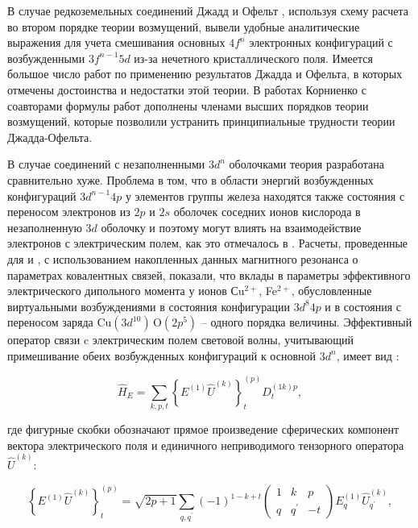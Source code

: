 В случае редкоземельных соединений Джадд \cite{Judd1962} и Офельт \cite{Ofelt1962}, используя схему расчета во втором порядке теории возмущений, вывели удобные аналитические выражения для учета смешивания основных $4f^n$ электронных конфигураций с возбужденными $3f^{n-1}5d$ из-за нечетного кристаллического поля. Имеется большое число работ по применению результатов Джадда и Офельта, в которых отмечены достоинства и недостатки этой теории. В работах Корниенко с соавторами \cite{Kornienko1990, Dunina2008, Dunina2014} формулы работ \cite{Judd1962, Ofelt1962} дополнены членами высших порядков теории возмущений, которые позволили устранить принципиальные трудности теории Джадда-Офельта. 

В случае соединений с незаполненными $3d^n$ оболочками теория разработана сравнительно хуже. Проблема в том, что в области энергий возбужденных конфигураций $3d^{n-1}4p$ у элементов группы железа находятся также состояния с переносом электронов из $2p$ и $2s$ оболочек соседних ионов кислорода в незаполненную $3d$ оболочку и поэтому могут влиять на взаимодействие электронов с электрическим полем, как это отмечалось в \cite{Kornienko1977}. Расчеты, проведенные для  \cite{Eremin2019jetp} и  \cite{Eremin2019prb}, с использованием накопленных данных магнитного резонанса о параметрах ковалентных связей, показали, что вклады в параметры эффективного электрического дипольного момента у ионов Сu$^{2+}$, Fe$^{2+}$, обусловленные виртуальными возбуждениями в состояния конфигурации $3d^{8}4p$ и в состояния с переносом заряда $\text{Cu}(3d^{10}) \, \text{O}(2p^{5})$ – одного порядка величины. 
Эффективный оператор связи c электрическим полем световой волны, учитывающий примешивание обеих возбужденных конфигураций к основной $3d^n$, имеет вид \cite{Eremin2019jetp, Eremin2019prb}:

\begin{equation}
	\label{eq:HE}
	\hat{H}_{E}=\sum_{k, p, t}\left\{E^{(1)} \hat{U}^{(k)}\right\}_{t}^{(p)} D_{t}^{(1 k) p},
\end{equation}

где фигурные скобки обозначают прямое произведение сферических компонент вектора электрического поля и единичного неприводимого тензорного оператора $\hat{U}^{(k)}$:

\begin{equation}
	\label{eq:electricalProduct}
	\left\{E^{(1)} \hat{U}^{(k)}\right\}_{t}^{(p)} = \sqrt{2p+1} \sum_{q,q^\prime} (-1)^{1-k+t} 
	\begin{pmatrix}
		1 & k & p \\
		q & q^\prime & -t
	\end{pmatrix}
	E_{q}^{(1)} \hat{U}_{q^\prime}^{(k)},
\end{equation}

